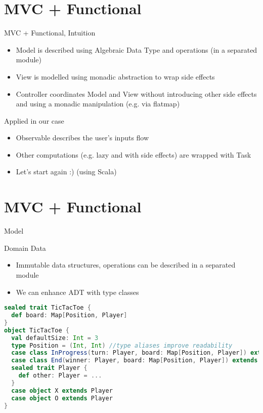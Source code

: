 \documentclass[presentation]{beamer}
\begin{document}
\section{MVC + Functional}
\begin{frame}[fragile]{MVC + Functional, Intuition}
\begin{itemize}
\item Model is described using Algebraic Data Type and operations (in a separated module)
\item View is modelled using monadic abstraction to wrap side effects
\item Controller coordinates Model and View without introducing other side effects and using a monadic manipulation (e.g. via flatmap)
\end{itemize}
\begin{block}{Applied in our case}
\begin{itemize}
\item Observable describes the user's inputs flow
\item Other computations (e.g. lazy and with side effects) are wrapped with Task
\item Let's start again :) (using Scala)
\end{itemize}
\end{block}
\end{frame}
\section{MVC + Functional}
\begin{frame}[fragile]{Model}
\begin{block}{Domain Data}
\begin{itemize}
\item Immutable data structures, operations can be described in a separated module
\item We can enhance ADT with type classes
\end{itemize}
\end{block}
\begin{lstlisting}[language=scala]
sealed trait TicTacToe {
  def board: Map[Position, Player]
}
object TicTacToe {
  val defaultSize: Int = 3
  type Position = (Int, Int) //type aliases improve readability
  case class InProgress(turn: Player, board: Map[Position, Player]) extends TicTacToe
  case class End(winner: Player, board: Map[Position, Player]) extends TicTacToe
  sealed trait Player {
    def other: Player = ...
  }
  case object X extends Player
  case object O extends Player
}
\end{lstlisting}
\end{frame}
\end{document}
